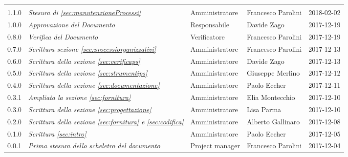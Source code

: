 \newpage 
\section*{}
\begin{table}[H]
	\centering
	\begin{tabular}{p{2cm}|C{4cm}|C{3cm}|C{3cm}|R{2cm}}

		
		
			 &  & &  & \\
		
		
		1.1.0  & \emph{Stesura di \ref{sec:manutenzioneProcessi}} &  Amministratore & Francesco Parolini & 2018-02-02  \\
		\hline
		
		1.0.0  & \emph{Approvazione del Documento} & Responsabile & Davide Zago &  2017-12-19 \\
		\hline
		
		0.8.0  &  \emph{Verifica del Documento} & Verificatore & Francesco Parolini & 2017-12-19 \\
		\hline
		
		0.7.0  & \emph{Scrittura sezione \ref{sec:processiorganizzativi}}  & Amministratore & Francesco Parolini & 2017-12-13\\
		\hline
		
		0.6.0  & \emph{Scrittura della sezione \ref{sec:verificaps}} &  Amministratore & Davide Zago  & 2017-12-13 \\
		\hline
		
		0.5.0  & \emph{Scrittura della sezione \ref{sec:strumentips}} & Amministratore & Giuseppe Merlino & 2017-12-12\\
		\hline
		
		0.4.0  &\emph{Scrittura della sezione \ref{sec:documentazione}}& Amministratore & Paolo Eccher  & 2017-12-11 \\
		\hline
		
		0.3.1 & \emph{Ampliata la sezione \ref{sec:fornitura}}& Amministratore & Elia Montecchio & 2017-12-10 \\
		\hline
		
		0.3.0 & \emph{Scrittura della sezione \ref{sec:progettazione}} & Amministratore & Lisa Parma & 2017-12-10 \\
		\hline
		
		0.2.0 & \emph{Scrittura della sezione \ref{sec:fornitura} e \ref{sec:codifica}} & Amministratore & Alberto Gallinaro & 2017-12-08 \\
		\hline
		
		0.1.0 & \emph{Scrittura \ref{sec:intro}} & Amministratore & Paolo Eccher & 2017-12-05 \\
		\hline
		
		0.0.1 &\emph{Prima stesura dello scheletro del documento} &  Project manager & Francesco Parolini & 2017-12-04 \\
		
	

	\end{tabular}
	
\end{table}


\clearpage